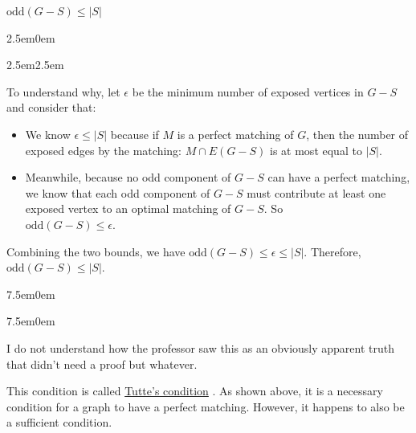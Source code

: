 \documentclass{book}
\newcommand{\hFour}{%
   \color{Cerulean}
   \fontsize{12}{14}\selectfont%
}
\newcommand{\myComment}{%
   \color{RawerSienna}%
   \fontsize{12}{14}\selectfont%
}
\newenvironment{myIndent}{%
   \begin{adjustwidth}{2.5em}{0em}%
}{%
   \end{adjustwidth}%
}
\newenvironment{myTindent}{%
   \begin{adjustwidth}{7.5em}{0em}%
}{%
   \end{adjustwidth}%
}
\newenvironment{myConstrict}{%
   \begin{adjustwidth}{2.5em}{2.5em}%
}{%
   \end{adjustwidth}%
}
\newcommand{\udefine}[1]{{%
   \setulcolor{Red}%
   \setul{0.14em}{0.07em}%
   \ul{#1}%
}}
\newcommand{\uuline}[2][.]{%
{\vphantom{a}\color{#1}%
\rlap{\rule[-0.18em]{\widthof{#2}}{0.06em}}%
\rlap{\rule[-0.32em]{\widthof{#2}}{0.06em}}}%
#2}
\newcommand{\oddComp}[1]{\mathrm{odd}(#1)}
\newcommand{\retTwo}{\hfill\bigbreak}
\begin{document}
{\centering $\oddComp{G - S} \leq |S|$ \retTwo \par}

{\begin{myIndent} \hFour
   \begin{myConstrict}
      To understand why, let $\epsilon$ be the \uuline{minimum} number of exposed vertices in $G - S$ and consider that:
      \begin{itemize}
         \item We know $\epsilon \leq |S|$ because if $M$ is a perfect matching of $G$, then the number of exposed edges by the matching: $M \cap E(G - S)$ is at most equal to $|S|$. 
         
         \item Meanwhile, because no odd component of $G - S$ can have a perfect matching, we know that each odd component of $G - S$ must contribute at least one exposed vertex to an optimal matching of $G - S$. So\\ $\oddComp{G - S} \leq \epsilon$.
      \end{itemize}
         Combining the two bounds, we have $\oddComp{G - S} \leq \epsilon \leq |S|$. Therefore, $\oddComp{G - S} \leq |S|$.
         
         \begin{myTindent}\begin{myTindent} \myComment
            I do not understand how the professor saw this as an obviously apparent truth that didn't need a proof but whatever.
         \end{myTindent}\end{myTindent}
   \end{myConstrict}
\end{myIndent}}
\retTwo

This condition is called \udefine{Tutte's condition}. As shown above, it is a necessary condition for a graph to have a perfect matching. However, it happens to also be a sufficient condition.
\end{document}
